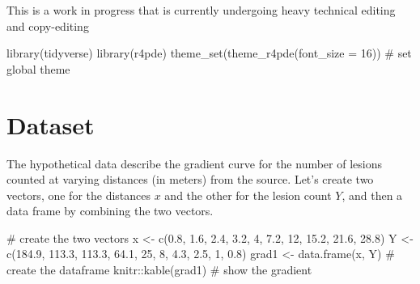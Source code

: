 \documentclass[
  letterpaper,
]{book}
\newenvironment{Shaded}{\begin{snugshade}}{\end{snugshade}}
\newcommand{\AttributeTok}[1]{\textcolor[rgb]{0.40,0.45,0.13}{#1}}
\newcommand{\CommentTok}[1]{\textcolor[rgb]{0.37,0.37,0.37}{#1}}
\newcommand{\DecValTok}[1]{\textcolor[rgb]{0.68,0.00,0.00}{#1}}
\newcommand{\FloatTok}[1]{\textcolor[rgb]{0.68,0.00,0.00}{#1}}
\newcommand{\FunctionTok}[1]{\textcolor[rgb]{0.28,0.35,0.67}{#1}}
\newcommand{\NormalTok}[1]{\textcolor[rgb]{0.00,0.23,0.31}{#1}}
\newcommand{\OtherTok}[1]{\textcolor[rgb]{0.00,0.23,0.31}{#1}}
\newcommand{\SpecialCharTok}[1]{\textcolor[rgb]{0.37,0.37,0.37}{#1}}
\begin{document}
\begin{tcolorbox}[enhanced jigsaw, bottomrule=.15mm, breakable, colback=white, rightrule=.15mm, toprule=.15mm, opacityback=0, leftrule=.75mm, colframe=quarto-callout-note-color-frame, left=2mm, arc=.35mm]
\begin{minipage}[t]{5.5mm}
\textcolor{quarto-callout-note-color}{\faInfo}
\end{minipage}%
\begin{minipage}[t]{\textwidth - 5.5mm}

This is a work in progress that is currently undergoing heavy technical
editing and copy-editing

\end{minipage}%
\end{tcolorbox}

\begin{Shaded}
\begin{Highlighting}[]
\FunctionTok{library}\NormalTok{(tidyverse)}
\FunctionTok{library}\NormalTok{(r4pde)}
\FunctionTok{theme\_set}\NormalTok{(}\FunctionTok{theme\_r4pde}\NormalTok{(}\AttributeTok{font\_size =} \DecValTok{16}\NormalTok{)) }\CommentTok{\# set global theme}
\end{Highlighting}
\end{Shaded}

\hypertarget{dataset}{%
\section{Dataset}\label{dataset}}

The hypothetical data describe the gradient curve for the number of
lesions counted at varying distances (in meters) from the source. Let's
create two vectors, one for the distances \(x\) and the other for the
lesion count \(Y\), and then a data frame by combining the two vectors.

\begin{Shaded}
\begin{Highlighting}[]
\CommentTok{\# create the two vectors}
\NormalTok{x }\OtherTok{\textless{}{-}} \FunctionTok{c}\NormalTok{(}\FloatTok{0.8}\NormalTok{, }\FloatTok{1.6}\NormalTok{, }\FloatTok{2.4}\NormalTok{, }\FloatTok{3.2}\NormalTok{, }\DecValTok{4}\NormalTok{, }\FloatTok{7.2}\NormalTok{, }\DecValTok{12}\NormalTok{, }\FloatTok{15.2}\NormalTok{, }\FloatTok{21.6}\NormalTok{, }\FloatTok{28.8}\NormalTok{)}
\NormalTok{Y }\OtherTok{\textless{}{-}} \FunctionTok{c}\NormalTok{(}\FloatTok{184.9}\NormalTok{, }\FloatTok{113.3}\NormalTok{, }\FloatTok{113.3}\NormalTok{, }\FloatTok{64.1}\NormalTok{, }\DecValTok{25}\NormalTok{, }\DecValTok{8}\NormalTok{, }\FloatTok{4.3}\NormalTok{, }\FloatTok{2.5}\NormalTok{, }\DecValTok{1}\NormalTok{, }\FloatTok{0.8}\NormalTok{)}
\NormalTok{grad1 }\OtherTok{\textless{}{-}} \FunctionTok{data.frame}\NormalTok{(x, Y) }\CommentTok{\# create the dataframe}
\NormalTok{knitr}\SpecialCharTok{::}\FunctionTok{kable}\NormalTok{(grad1) }\CommentTok{\# show the gradient}
\end{Highlighting}
\end{Shaded}
\end{document}

